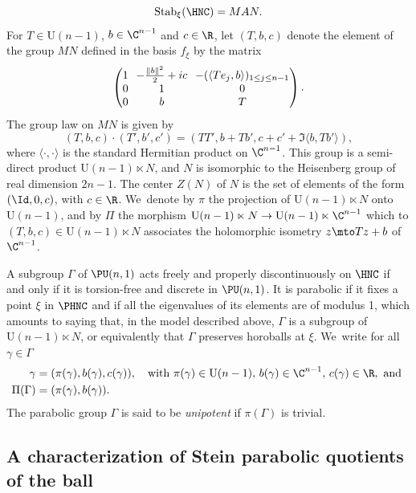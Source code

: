 \begin{equation*}
\operatorname{Stab}_{\xi}(\HNC)= MAN.
\end{equation*}
For $T\in \mathrm{U}(n-1)$, $b\in \C^{n-1}$ and $c\in \R$, let $(T,b,c)$ denote the element of the group $MN$ defined in the basis $f_{\xi}$ by the matrix
\begin{equation*}
\arraycolsep3.5pt\begin{pmatrix}
1 & -\frac{\lVert b\rVert^{2}}{2}+ic & -(\langle Te_j,b\rangle)_{1\le j\le n-1} \\
0 & 1 & 0 \\
0 & b & T
\end{pmatrix}.
\end{equation*}
The group law on $MN$ is given by
\begin{equation*}
(T,b,c)\cdot(T',b',c') = (TT',b+Tb',c+c'+\Im\langle b,Tb' \rangle),
\end{equation*}
where $\langle\cdot,\cdot\rangle$ is the standard Hermitian product on $\C^{n-1}$. This group is a semi-direct product $\mathrm{U}(n-1)\ltimes N$, and $N$ is isomorphic to the Heisenberg group of real dimension $2n-1$. The center $Z(N)$ of $N$ is the set of elements of the form $(\Id,0,c)$, with $c\in \R$. We~denote by $\pi$ the projection of $\mathrm{U}(n-1)\ltimes N$ onto $\mathrm{U}(n-1)$, and by $\Pi$ the morphism $\mathrm{U}(n-1)\ltimes N \to \mathrm{U}(n-1)\ltimes \C^{n-1}$ which to $(T,b,c)\in \mathrm{U}(n-1)\ltimes N$ associates the holomorphic isometry $z\mto Tz+b$ of $\C^{n-1}$.

A subgroup $\Gamma$ of $\PU(n,1)$ acts freely and properly discontinuously on $\HNC$ if and only if it is torsion-free and discrete in $\PU(n,1)$. It is parabolic if it fixes a point $\xi$ in $\PHNC$ and if all the eigenvalues of its elements are of modulus 1, which amounts to saying that, in the model described above, $\Gamma$ is a subgroup of $\mathrm{U}(n-1)\ltimes N$, or equivalently that $\Gamma$ preserves horoballs at $\xi$. We~write for all $\gamma\in \Gamma$
\begin{align*}
\gamma &= (\pi(\gamma),b(\gamma),c(\gamma)),\quad \text{with } \pi(\gamma)\in \mathrm{U}(n-1),\,b(\gamma)\in \C^{n-1},\,c(\gamma)\in \R, \text{ and }\\
\Pi(\Gamma) &= (\pi(\gamma),b(\gamma)).
\end{align*}
The parabolic group $\Gamma$ is said to be \textit{unipotent} if $\pi(\Gamma)$ is trivial.

\subsection{A characterization of Stein parabolic quotients of the ball}

